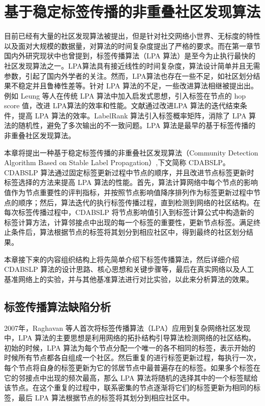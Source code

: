 \chapter{基于稳定标签传播的非重叠社区发现算法}
目前已经有大量的社区发现算法被提出，但是针对社交网络小世界、无标度的特性以及面对大规模的数据量，对算法的时间复杂度提出了严格的要求。而在第一章节国内外研究现状中也曾提到，标签传播算法（LPA 算法）是至今为止执行最快的社区发现算法之一。LPA算法具有接近线性的时间复杂度，算法设计简单并且无需参数，引起了国内外学者的关注。然而，LPA算法也存在一些不足，如社区划分结果不稳定并且鲁棒性差等。针对 LPA 算法的不足，一些改进算法相继被提出出。例如 Leung 等人\cite{Leung2009Towards}在传统 LPA 算法中加入启发式思想，引入标签在节点的 hop score 值，改进 LPA算法的效率和性能。文献\cite{He2014A}通过改进LPA 算法的迭代结束条件，提高 LPA 算法的效率。LabelRank 算法\cite{Xie2013LabelRank}引入标签概率矩阵，消除了 LPA 算法的随机性，避免了多次输出的不一致问题。LPA 算法是最早的基于标签传播的非重叠社区发现算法。

本章将提出一种基于稳定标签传播的非重叠社区发现算法（Community Detection Algorithm Based on Stable Label Propagation）,下文简称 CDABSLP。CDABSLP 算法通过固定标签更新过程中节点的顺序，并且改进节点标签更新时标签选择的方法来提高 LPA 算法的性能。首先，算法计算网络中每个节点的影响值作为节点重要性的评判指标，并按照节点影响值降序排列作为标签更新过程中节点的顺序；然后，算法迭代的执行标签传播过程，直到检测到网络的社区结构。在每次标签传播过程中，CDABSLP 将节点影响值引入到标签计算公式中构造新的标签计算方法，计算邻接点中出现的每一个标签的重要性，更新节点标签。满足终止条件后，算法根据节点的标签将其划分到相应社区中，得到最终的社区划分结果。

本章接下来的内容组织结构上将先简单介绍下标签传播算法，然后详细介绍CDABSLP 算法的设计思路、核心思想和关键步骤等，最后在真实网络以及人工基准网络上的实验，并与其他基准算法进行对比实验，以此来分析算法的效果。

\section{标签传播算法缺陷分析}

2007年，Raghavan 等人\cite{Raghavan2007Near}首次将标签传播算法（LPA）应用到复杂网络社区发现中，LPA 算法的主要思想是利用网络的拓扑结构引导算法检测网络的社区结构。初始的时候，LPA 算法为每个节点分配一个唯一的各不相同的标签，表示开始的时候所有节点都各自组成一个社区。然后重复的进行标签更新过程，每执行一次，每个节点将自身的标签更新为它的邻居节点中最普遍存在的标签。如果多个标签在它的邻接点中出现的频次最高，那么 LPA 算法将随机的选择其中的一个标签赋给该节点。在这个重复的过程中，联系密集的节点逐渐将它们的标签更新为相同的标签，最后 LPA 算法根据节点的标签将其划分到相应社区中。

